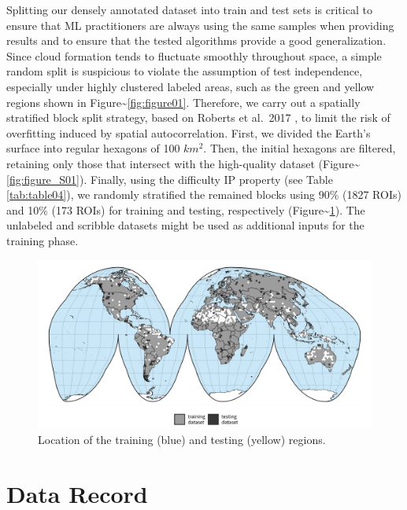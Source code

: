 \documentclass[a4paper, nobind]{templates/cdethesis}
\begin{document}
Splitting our densely annotated dataset into train and test sets is critical to ensure that ML practitioners are always using the same samples when providing results and to ensure that the tested algorithms provide a good generalization. Since cloud formation tends to fluctuate smoothly throughout space, a simple random split is suspicious to violate the assumption of test independence, especially under highly clustered labeled areas, such as the green and yellow regions shown in Figure\textasciitilde{}\ref{fig:figure01}. Therefore, we carry out a spatially stratified block split strategy\cite{Valavi2019}, based on Roberts et al.~2017 \cite{Roberts2017a}, to limit the risk of overfitting induced by spatial autocorrelation. First, we divided the Earth's surface into regular hexagons of 100 \(km^{2}\). Then, the initial hexagons are filtered, retaining only those that intersect with the high-quality dataset (Figure\textasciitilde{}\ref{fig:figure_S01}). Finally, using the difficulty IP property (see Table \ref{tab:table04}), we randomly stratified the remained blocks using 90\% (1827 ROIs) and 10\% (173 ROIs) for training and testing, respectively (Figure\textasciitilde{}\ref{fig:figure09}). The unlabeled and scribble datasets might be used as additional inputs for the training phase.

\begin{figure}[!h]
    \centering
    \includegraphics[width=0.9\linewidth]{figures/chapter01/figure09.png}
    \caption{Location of the training (blue) and testing (yellow) regions.}
    \label{fig:figure09}
\end{figure}

\hypertarget{data-record}{%
\section{Data Record}\label{data-record}}
\end{document}
